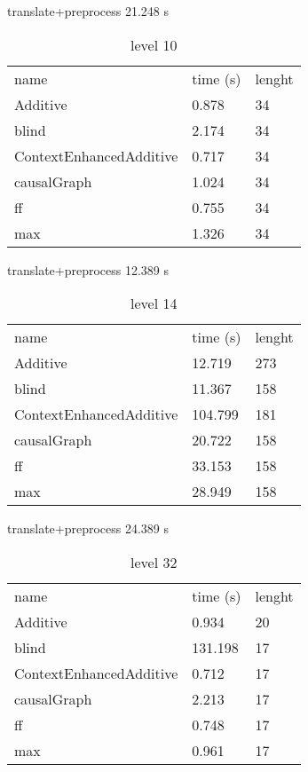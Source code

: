 	\begin{table}[h]
		\centering
		\caption{level 10}
		\label{tablvl10}
		translate+preprocess
		21.248 s\\
		\begin{tabular}{lll}
			
			
			name & time (s)& lenght\\
			Additive & 0.878 & 34\\
			blind & 2.174 & 34\\
			ContextEnhancedAdditive & 0.717 & 34\\
			causalGraph & 1.024 & 34\\
			ff & 0.755 & 34\\
			max & 1.326 & 34\\
		\end{tabular}
	\end{table}
	\begin{table}[h]
		\centering
		\caption{level 14}
		\label{prob4}
		translate+preprocess
		12.389 s\\
		\begin{tabular}{lll}
			
			
			name & time (s)& lenght\\
			Additive & 12.719 & 273\\
			blind & 11.367 & 158\\
			ContextEnhancedAdditive & 104.799 & 181\\
			causalGraph & 20.722 & 158\\
			ff & 33.153 & 158\\
			max & 28.949 & 158\\
		\end{tabular}
	\end{table}
	
	\begin{table}[h]
		\centering
		\caption{level 32}
		\label{tablvl32}
		translate+preprocess
		24.389 s\\
		\begin{tabular}{lll}
			
			name & time (s)& lenght\\
			Additive & 0.934 & 20\\
			blind & 131.198 & 17\\
			ContextEnhancedAdditive & 0.712 & 17\\
			causalGraph & 2.213 & 17\\
			ff & 0.748 & 17\\
			max & 0.961 & 17\\
		\end{tabular}
	\end{table}
